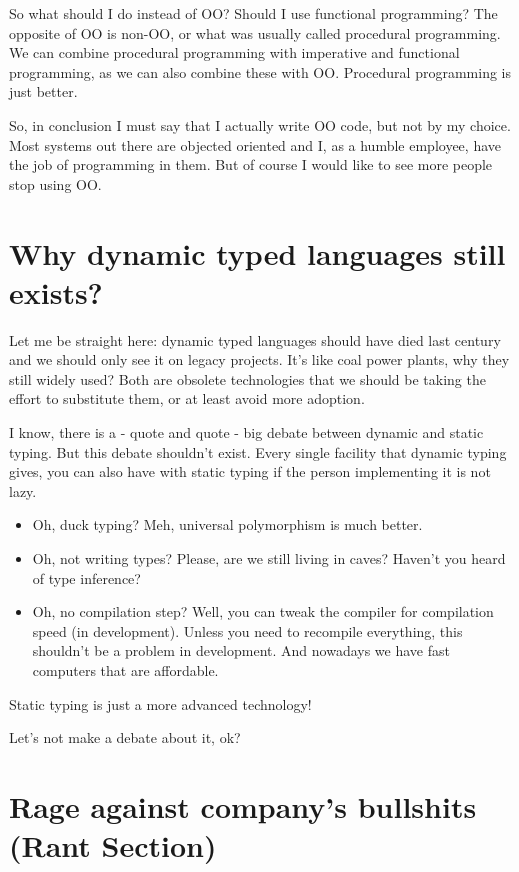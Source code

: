 \documentclass[11pt,a4paper,sans]{moderncv}
\begin{document}
So what should I do instead of OO?
Should I use functional programming?
The opposite of OO is non-OO, or what was usually called procedural programming.
We can combine procedural programming with imperative and functional programming, as we can also combine these with OO.
Procedural programming is just better.

\medskip

So, in conclusion I must say that I actually write OO code, but not by my choice.
Most systems out there are objected oriented and I, as a humble employee, have the job of programming in them.
But of course I would like to see more people stop using OO.

\section{Why dynamic typed languages still exists?}
Let me be straight here:
dynamic typed languages should have died last century and we should only see it on legacy projects.
It's like coal power plants, why they still widely used?
Both are obsolete technologies that we should be taking the effort to substitute them, or at least avoid more adoption.

\medskip

I know, there is a - quote and quote - big debate between dynamic and static typing.
But this debate shouldn't exist.
Every single facility that dynamic typing gives, you can also have with static typing if the person implementing it is not lazy.

\begin{itemize}
  \item Oh, duck typing? Meh, universal polymorphism is much better.
  \item Oh, not writing types? Please, are we still living in caves? Haven't you heard of type inference?
  \item Oh, no compilation step? Well, you can tweak the compiler for compilation speed (in development).
        Unless you need to recompile everything, this shouldn't be a problem in development.
        And nowadays we have fast computers that are affordable.
\end{itemize}

Static typing is just a more advanced technology!

Let's not make a debate about it, ok?

\section{Rage against company's bullshits (Rant Section)}
\end{document}
